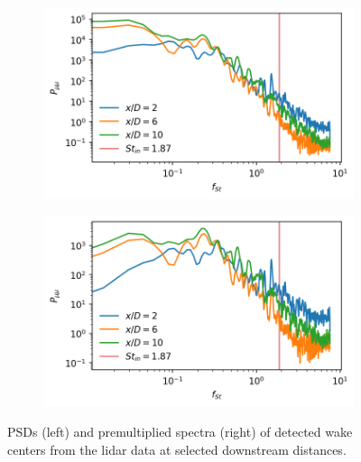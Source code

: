\documentclass[%
 aip,
 amsmath,
 amssymb,
preprint,%
]{revtex4-2}
\begin{document}
\begin{figure}[htbp]
  \centering
  \begin{subfigure}[b]{0.48\columnwidth}
    \includegraphics[width=\columnwidth]{figs/wakePSD_20240925.png}
  \end{subfigure}
  \begin{subfigure}[b]{0.48\columnwidth}
    \includegraphics[width=\columnwidth]{figs/wakePremult_20240925.png}
  \end{subfigure}
  \caption{PSDs (left) and premultiplied spectra (right) of detected wake centers from the lidar data at selected downstream distances.}
  \label{fig:lidarSpec}
\end{figure}
\end{document}
